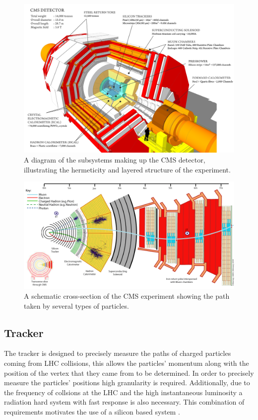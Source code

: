 \begin{figure}
  \includegraphics[width=1.2\largefigwidth]{plots/detector/cms_120918_03.png}
  \caption{A diagram of the subsystems making up the CMS detector, illustrating the hermeticity and layered structure of the experiment.\cite{cmsschematic}}
  \label{fig:cmsschematic1}
\end{figure}

\begin{figure}
  \includegraphics[width=1.2\largefigwidth]{plots/detector/CMS_Slice.png}
  \caption{A schematic cross-section of the CMS experiment showing the path taken by several types of particles.\cite{CMSSlice}}
  \label{fig:cmsschematic2}
\end{figure}

\subsection{Tracker}
\label{sec:tracker}
The tracker is designed to precisely measure the paths of charged particles coming from LHC collisions, this allows the particles' momentum along with the position of the vertex that they came from to be determined. In order to precisely measure the particles' positions high granularity is required. Additionally, due to the frequency of collsions at the LHC and the high instantaneous luminosity a radiation hard system with fast response is also necessary. This combination of requirements motivates the use of a silicon based system \cite{Chatrchyan:2008aa}.

